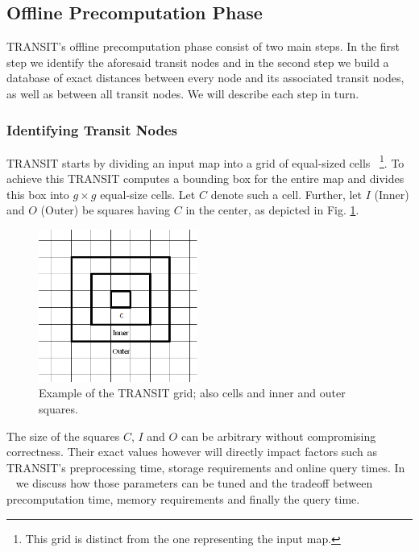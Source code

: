 \documentclass[runningheads,a4paper]{llncs}
\begin{document}
\subsection {Offline Precomputation Phase}\label{sub:precomputation}
TRANSIT's offline precomputation phase consist of two main steps. In the first step we identify the aforesaid transit nodes 
and in the second step we build a database of exact distances between every node and its associated transit nodes, as well as between all transit nodes. 
We will describe each step in turn.

\subsubsection{Identifying Transit Nodes}\label{sub:determine}
TRANSIT starts by dividing an input map into a grid of equal-sized cells~
\footnote{ This grid is distinct from the one representing the input map.}.
To achieve this TRANSIT computes a bounding box for the entire map and divides this box
into $g \times g$ equal-size cells. Let $C$ denote such a cell. Further, let $I$ (Inner) and $O$ (Outer)
be squares having $C$ in the center, as depicted in Fig. \ref{fig:example}.

\begin{figure}[tb]
\centering
\includegraphics[height=5cm]{transit_example3.PNG}
\caption{Example of the TRANSIT grid; also cells and inner and outer squares. }
\label{fig:example}
\end{figure}

The size of the squares $C$, $I$ and $O$ can be arbitrary without compromising correctness. Their exact
values however will directly impact factors such as TRANSIT's preprocessing time, storage requirements and
online query times. In ~\cite{leon_daniel} we discuss how those parameters can be tuned and the tradeoff 
between precomputation time, memory requirements and finally the query time.
\end{document}
